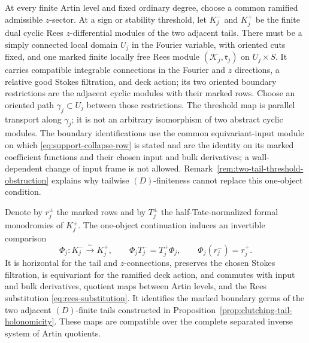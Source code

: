 \begin{hypothesis}
\label{hyp:marked-threshold-wall}
At every finite Artin level and fixed ordinary degree, choose a common
ramified admissible \(z\)-sector.  At a sign or stability threshold, let
\(K_j^-\) and \(K_j^+\) be the finite dual cyclic Rees
\(z\)-differential modules of the two adjacent tails.  There must be a
simply connected local domain \(U_j\) in the Fourier variable, with oriented
cuts fixed, and one marked finite locally free Rees module
\((\mathcal K_j,\mathfrak r_j)\) on \(U_j\times S\).  It carries compatible
integrable connections in the Fourier and \(z\) directions, a relative good
Stokes filtration, and deck action; its two oriented boundary restrictions
are the adjacent cyclic modules with their marked rows.  Choose an oriented
path \(\gamma_j\subset U_j\) between those restrictions.  The threshold map
is parallel transport along \(\gamma_j\); it is not an arbitrary isomorphism
of two abstract cyclic modules.  The boundary identifications use the common
equivariant-input module on which \eqref{eq:support-collapse-row} is stated and
are the identity on its marked coefficient functions and their chosen input
and bulk derivatives; a wall-dependent change of input frame is not allowed.
Remark~\ref{rem:two-tail-threshold-obstruction} explains why tailwise
\((D)\)-finiteness cannot replace this one-object condition.

Denote by \(r_j^\pm\) the marked rows and by \(T_j^\pm\) the
half-Tate-normalized formal monodromies of \(K_j^\pm\).  The one-object
continuation induces an invertible comparison
\begin{equation}\label{eq:marked-threshold-map}
 \Phi_j:K_j^-\xrightarrow{\sim}K_j^+,
 \qquad
 \Phi_jT_j^-=T_j^+\Phi_j,
 \qquad \Phi_j(r_j^-)=r_j^+.
\end{equation}
It is horizontal for the tail and \(z\)-connections, preserves the chosen
Stokes filtration, is equivariant for the ramified deck action, and commutes
with input and bulk derivatives, quotient maps between Artin levels, and the
Rees substitution \eqref{eq:rees-substitution}.  It identifies the marked
boundary germs of the two adjacent \((D)\)-finite tails constructed in
Proposition~\ref{prop:clutching-tail-holonomicity}.  These maps are
compatible over the complete separated inverse system of Artin quotients.
\end{hypothesis}

